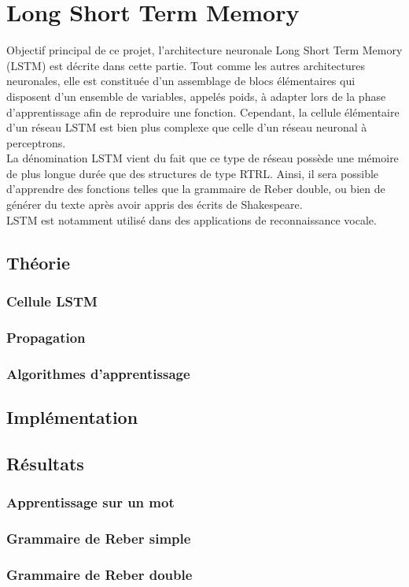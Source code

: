 
\chapter{Long Short Term Memory}
Objectif principal de ce projet, l'architecture neuronale Long Short Term Memory
(LSTM) est décrite dans cette partie. Tout comme les autres architectures
neuronales, elle est constituée d'un assemblage de blocs élémentaires qui
disposent d'un ensemble de variables, appelés poids, à adapter lors de la phase
d'apprentissage afin de reproduire une fonction. Cependant, la cellule
élémentaire d'un réseau LSTM est bien plus complexe que celle d'un réseau
neuronal à perceptrons. \\

La dénomination LSTM vient du fait que ce type de réseau possède une mémoire de
plus longue durée que des structures de type RTRL. Ainsi, il sera possible
d'apprendre des fonctions telles que la grammaire de Reber double, ou bien de
générer du texte après avoir appris des écrits de Shakespeare. \\
LSTM est notamment utilisé dans des applications de reconnaissance vocale.

\section{Théorie}
\subsection{Cellule LSTM}
\subsection{Propagation}
\subsection{Algorithmes d'apprentissage}

\section{Implémentation}

\section{Résultats}
\subsection{Apprentissage sur un mot}
\subsection{Grammaire de Reber simple}
\subsection{Grammaire de Reber double}
